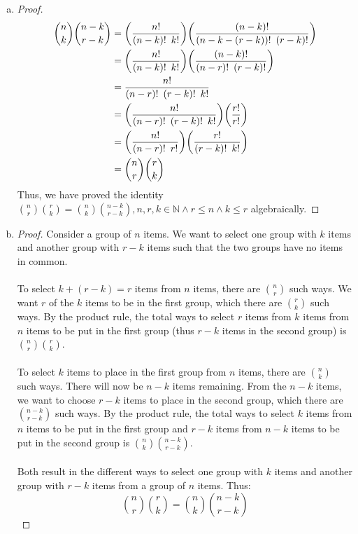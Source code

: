 \documentclass[article, 11pt]{article}
\DeclarePairedDelimiter\paren{(}{)} %
\newcommand{\nats}{\mathbb{N}}
\begin{document}
\begin{enumerate}[a)]
    \item 
    \begin{proof}
        
        \begin{align*}
            \binom{n}{k}\binom{n-k}{r-k} &= \paren*{\frac{n!}{(n-k)! \enspace k!}}\paren*{\frac{(n-k)!}{(n-k - (r-k))! \enspace (r-k)!}} \\
                                         &= \paren*{\frac{n!}{(n-k)! \enspace k!}}\paren*{\frac{(n-k)!}{(n-r)! \enspace (r-k)!}} \\
                                         &= \frac{n!}{(n-r)! \enspace (r-k)! \enspace k!} \\
                                         &= \paren*{\frac{n!}{(n-r)! \enspace (r-k)! \enspace k!}}\paren*{\frac{r!}{r!}} \\
                                         &= \paren*{\frac{n!}{(n-r)! \enspace r!}}\paren*{\frac{r!}{(r-k)! \enspace k!}} \\
                                         &= \binom{n}{r}\binom{r}{k}
        \end{align*}
        Thus, we have proved the identity $\binom{n}{r}\binom{r}{k}=\binom{n}{k}\binom{n-k}{r-k},n,r,k \in \nats \land r \leq n \land k \leq r$ algebraically.
    \end{proof}
    \item 
    \begin{proof}
        Consider a group of $n$ items. We want to select one group with $k$ items and another group with $r-k$ items such that the two groups have no items in common. \\
        \\
        To select $k + (r - k) = r$ items from $n$ items, there are $\binom{n}{r}$ such ways. We want $r$ of the $k$ items to be in the first group, which there are $\binom{r}{k}$ such ways. By the product rule, the total ways to select $r$ items from $k$ items from $n$ items to be put in the first group (thus $r-k$ items in the second group) is $\binom{n}{r}\binom{r}{k}$. \\
        \\
        To select $k$ items to place in the first group from $n$ items, there are $\binom{n}{k}$ such ways. There will now be $n-k$ items remaining. From the $n-k$ items, we want to choose $r-k$ items to place in the second group, which there are $\binom{n-k}{r-k}$ such ways. By the product rule, the total ways to select $k$ items from $n$ items to be put in the first group and $r-k$ items from $n-k$ items to be put in the second group is $\binom{n}{k}\binom{n-k}{r-k}$. \\
        \\
        Both result in the different ways to select one group with $k$ items and another group with $r-k$ items from a group of $n$ items. Thus:
        \[ \binom{n}{r}\binom{r}{k} =\binom{n}{k}\binom{n-k}{r-k} \]
    \end{proof}
\end{enumerate}
\end{document}
